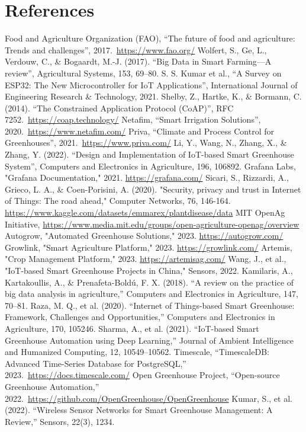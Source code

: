 \documentclass[12pt,a4paper]{article}
\begin{document}
\section{References}
\begin{thebibliography}{99}
 Food and Agriculture Organization (FAO), ``The future of food and agriculture: Trends and challenges'', 2017.\ \url{https://www.fao.org/}
 Wolfert, S., Ge, L., Verdouw, C., \& Bogaardt, M.-J. (2017). ``Big Data in Smart Farming---A review'', Agricultural Systems, 153, 69--80.
 S. S. Kumar et al., ``A Survey on ESP32: The New Microcontroller for IoT Applications'', International Journal of Engineering Research \& Technology, 2021.
 Shelby, Z., Hartke, K., \& Bormann, C. (2014). ``The Constrained Application Protocol (CoAP)'', RFC 7252.\ \url{https://coap.technology/}
 Netafim, ``Smart Irrigation Solutions'', 2020.\ \url{https://www.netafim.com/}
 Priva, ``Climate and Process Control for Greenhouses'', 2021.\ \url{https://www.priva.com/}
 Li, Y., Wang, N., Zhang, X., \& Zhang, Y. (2022). ``Design and Implementation of IoT-based Smart Greenhouse System'', Computers and Electronics in Agriculture, 196, 106892.
 Grafana Labs, "Grafana Documentation," 2021. \url{https://grafana.com/}
 Sicari, S., Rizzardi, A., Grieco, L. A., \& Coen-Porisini, A. (2020). "Security, privacy and trust in Internet of Things: The road ahead," Computer Networks, 76, 146-164.
 \url{https://www.kaggle.com/datasets/emmarex/plantdisease/data}
 MIT OpenAg Initiative, \url{https://www.media.mit.edu/groups/open-agriculture-openag/overview}
 Autogrow, "Automated Greenhouse Solutions," 2023. \url{https://autogrow.com/}
 Growlink, "Smart Agriculture Platform," 2023. \url{https://growlink.com/}
 Artemis, "Crop Management Platform," 2023. \url{https://artemisag.com/}
 Wang, J., et al., "IoT-based Smart Greenhouse Projects in China," Sensors, 2022.
 Kamilaris, A., Kartakoullis, A., \& Prenafeta-Boldú, F. X. (2018). ``A review on the practice of big data analysis in agriculture,'' Computers and Electronics in Agriculture, 147, 70--81.
 Raza, M. Q., et al. (2020). ``Internet of Things-based Smart Greenhouse: Framework, Challenges and Opportunities,'' Computers and Electronics in Agriculture, 170, 105246.
 Sharma, A., et al. (2021). ``IoT-based Smart Greenhouse Automation using Deep Learning,'' Journal of Ambient Intelligence and Humanized Computing, 12, 10549--10562.
 Timescale, ``TimescaleDB: Advanced Time-Series Database for PostgreSQL,'' 2023.\ \url{https://docs.timescale.com/}
 Open Greenhouse Project, ``Open-source Greenhouse Automation,'' 2022.\ \url{https://github.com/OpenGreenhouse/OpenGreenhouse}
 Kumar, S., et al. (2022). ``Wireless Sensor Networks for Smart Greenhouse Management: A Review,'' Sensors, 22(3), 1234.
\end{thebibliography}
\end{document}
